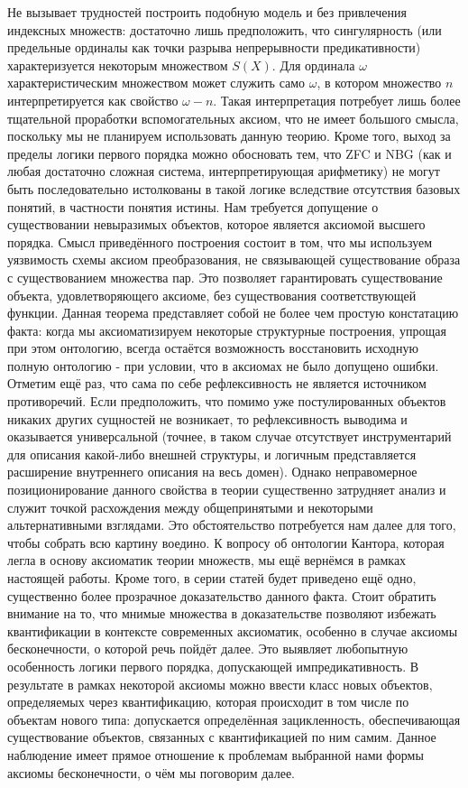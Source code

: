 \documentclass[12pt]{article}
\begin{document}
Не вызывает трудностей построить подобную модель и без привлечения индексных множеств: достаточно лишь предположить, что сингулярность (или предельные ординалы как точки разрыва непрерывности предикативности) характеризуется некоторым множеством $S(X)$. Для ординала $\omega$ характеристическим множеством может служить само $\omega$, в котором множество $n$ интерпретируется как свойство $\omega - n$. Такая интерпретация потребует лишь более тщательной проработки вспомогательных аксиом, что не имеет большого смысла, поскольку мы не планируем использовать данную теорию. Кроме того, выход за пределы логики первого порядка можно обосновать тем, что ZFC и NBG (как и любая достаточно сложная система, интерпретирующая арифметику) не могут быть последовательно истолкованы в такой логике вследствие отсутствия базовых понятий, в частности понятия истины. Нам требуется допущение о существовании невыразимых объектов, которое является аксиомой высшего порядка. Смысл приведённого построения состоит в том, что мы используем уязвимость схемы аксиом преобразования, не связывающей существование образа с существованием множества пар. Это позволяет гарантировать существование объекта, удовлетворяющего аксиоме, без существования соответствующей функции. Данная теорема представляет собой не более чем простую констатацию факта: когда мы аксиоматизируем некоторые структурные построения, упрощая при этом онтологию, всегда остаётся возможность восстановить исходную полную онтологию - при условии, что в аксиомах не было допущено ошибки. Отметим ещё раз, что сама по себе рефлексивность не является источником противоречий. Если предположить, что помимо уже постулированных объектов никаких других сущностей не возникает, то рефлексивность выводима и оказывается универсальной (точнее, в таком случае отсутствует инструментарий для описания какой-либо внешней структуры, и логичным представляется расширение внутреннего описания на весь домен). Однако неправомерное позиционирование данного свойства в теории существенно затрудняет анализ и служит точкой расхождения между общепринятыми и некоторыми альтернативными взглядами. Это обстоятельство потребуется нам далее для того, чтобы собрать всю картину воедино. К вопросу об онтологии Кантора, которая легла в основу аксиоматик теории множеств, мы ещё вернёмся в рамках настоящей работы. Кроме того, в серии статей будет приведено ещё одно, существенно более прозрачное доказательство данного факта. Стоит обратить внимание на то, что мнимые множества в доказательстве позволяют избежать квантификации в контексте современных аксиоматик, особенно в случае аксиомы бесконечности, о которой речь пойдёт далее. Это выявляет любопытную особенность логики первого порядка, допускающей импредикативность. В результате в рамках некоторой аксиомы можно ввести класс новых объектов, определяемых через квантификацию, которая происходит в том числе по объектам нового типа: допускается определённая зацикленность, обеспечивающая существование объектов, связанных с квантификацией по ним самим. Данное наблюдение имеет прямое отношение к проблемам выбранной нами формы аксиомы бесконечности, о чём мы поговорим далее.
\end{document}
